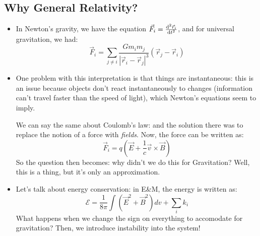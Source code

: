 \subsection{Why General Relativity?}
\begin{itemize}
	\item In Newton's gravity, we have the equation \( \vec F_i = \dv[2]{\vec r_i}{t} \), and for universal 
		gravitation, we had:
		\[
		\vec F_i = \sum_{j\neq i}\frac{G m_i m_j}{|\vec r_i - \vec r_j|^3}(\vec r_j - \vec r_i)
		\] 
	\item One problem with this interpretation is that things are instantaneous: this is an issue because objects
		don't react instantaneously to changes (information 
		can't travel faster than the speed of light), which Newton's equations seem to imply. 

		We can say the same about Coulomb's law: and the solution there was to replace the notion of a force 
		with \textit{fields}. Now, the force can be written as: 
		\[
		\vec F_i = q(\vec E + \frac{1}{c}\vec v \times \vec B)
		\] 
		So the question then becomes: why didn't we do this for Gravitation? Well, this is a thing, but it's 
		only an approximation. 
	\item Let's talk about energy conservation: in E\&M, the energy is written as:
		\[
		\mathcal E = \frac{1}{8\pi}\int (\vec E^2 + \vec B ^2) dv + \sum_i k_i
		\] 
		What happens when we change the sign on everything to accomodate for gravitation? Then, we introduce instability 
		into the system! 
\end{itemize}
